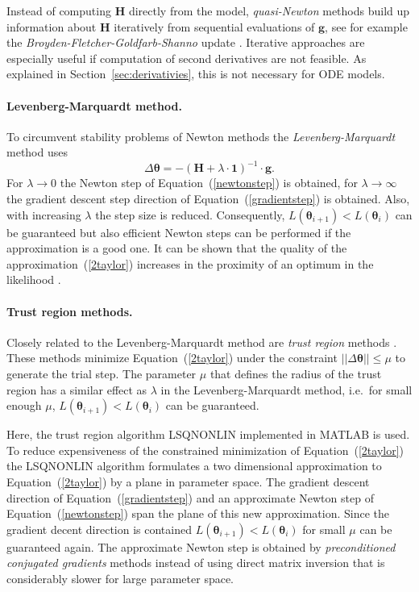 \documentclass[12pt,a4paper]{scrartcl}
\begin{document}
Instead of computing $\mathbf{H}$ directly from the model, \emph{quasi-Newton} methods 
build up information about $\mathbf{H}$ iteratively from sequential evaluations of $
\mathbf{g}$, see for example the \emph{Broyden-Fletcher-Goldfarb-Shanno} update 
\citep{Shanno:1970fk}. Iterative approaches are especially useful if computation of second 
derivatives are not feasible. As explained in Section~\ref{sec:derivativies}, this is not 
necessary for ODE models.

\paragraph{Levenberg-Marquardt method.}
To circumvent stability problems of Newton methods the \emph{Levenberg-Marquardt} 
method \citep{Marquardt:1963uq} uses 
\begin{equation}
	\Delta \boldsymbol{\theta} = -(\mathbf{H} + \lambda \cdot \mathbf{1})^{-1} \cdot 	
\mathbf{g}. 
\end{equation}	
For $\lambda \rightarrow 0$ the Newton step of Equation~(\ref{newtonstep}) is obtained, 
for $\lambda \rightarrow \infty$ the gradient descent step direction of 
Equation~(\ref{gradientstep}) is obtained. Also, with increasing $\lambda$ the step size is 
reduced. Consequently, $L(\boldsymbol{\theta}_{i+1}) < L(\boldsymbol{\theta}_{i})$ can be 
guaranteed but also efficient Newton steps can be performed if the approximation is a 
good one. It can be shown that the quality of the approximation~(\ref{2taylor}) increases in 
the proximity of an optimum in the likelihood \citep{Seber:2003kq}.

\paragraph{Trust region methods.}
Closely related to the Levenberg-Marquardt method are \emph{trust region} methods 
\citep{Coleman:1996fk}. These methods minimize Equation~(\ref{2taylor}) under the 
constraint $\left|\left| \Delta \boldsymbol{\theta} \right|\right| \leq \mu $ to generate the trial 
step. The parameter $\mu$ that defines the radius of the trust region has a similar effect 
as $\lambda$ in the Levenberg-Marquardt method, i.e.~for small enough $\mu$, 
$L(\boldsymbol{\theta}_{i+1}) < L(\boldsymbol{\theta}_{i})$ can be guaranteed.

Here, the trust region algorithm LSQNONLIN implemented in MATLAB is used. To reduce expensiveness of the constrained minimization of 
Equation~(\ref{2taylor}) the LSQNONLIN algorithm formulates a two dimensional 
approximation to Equation~(\ref{2taylor}) by a plane in parameter space. The gradient 
descent direction of Equation~(\ref{gradientstep}) and an approximate Newton step of 
Equation~(\ref{newtonstep}) span the plane of this new approximation. Since the gradient 
decent direction is contained $L(\boldsymbol{\theta}_{i+1}) < L(\boldsymbol{\theta}_{i})$ 
for small $\mu$ can be guaranteed again. The approximate Newton step is obtained by 
\emph{preconditioned conjugated gradients} methods \citep{Barrett:1994uq} instead of 
using direct matrix inversion that is considerably slower for large parameter space.
\end{document}
